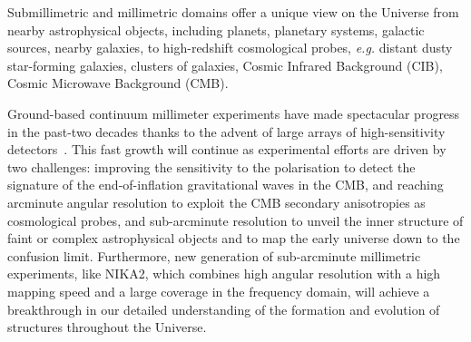 %

Submillimetric and millimetric domains offer a unique view on the
Universe from nearby astrophysical objects, including planets,
planetary systems, galactic sources, nearby galaxies, to high-redshift
cosmological probes, \emph{e.g.} distant dusty star-forming galaxies,
clusters of galaxies, Cosmic Infrared Background (CIB), Cosmic Microwave
Background (CMB).

Ground-based {\lp continuum} millimeter experiments have made spectacular progress in
the past-two decades thanks to the advent of large arrays of
high-sensitivity detectors~\citep{Wilson2008_AZTEC,
  Siringo2009_LABOCA, Swetz2011_ACT, Bleem2012_SPT, Monfardini2011_NIKA, Holland2013_SCUBA2,
  Dicker2014_MUSTANG2, Adam2017}. %
This fast growth will continue as experimental efforts are
driven by two challenges: improving the sensitivity to the
polarisation to detect the signature of
the end-of-inflation gravitational waves in the CMB, and reaching
arcminute angular resolution to exploit the CMB secondary anisotropies
as cosmological probes, and sub-arcminute resolution to unveil the
inner structure of faint or complex astrophysical objects and to map
the early universe down to the confusion limit. Furthermore, new
generation of sub-arcminute millimetric experiments, like NIKA2, which
combines high angular resolution with a high mapping speed and a large
coverage in the frequency domain, will achieve a breakthrough in 
our detailed understanding of the formation and evolution of
structures throughout the Universe.


